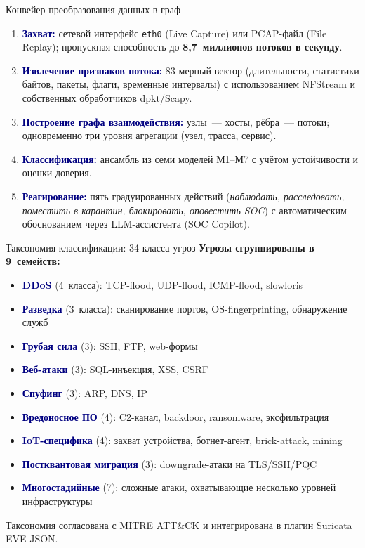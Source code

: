 \documentclass[10pt,aspectratio=169]{beamer}
\newcommand{\hl}[1]{\textcolor{accent}{\textbf{#1}}}
\newcommand{\bn}[1]{\textcolor{navy}{\textbf{#1}}}
\begin{document}
\begin{frame}{Конвейер преобразования данных в граф}
\small
\begin{enumerate}\setlength\itemsep{2pt}
\item \bn{Захват:} сетевой интерфейс \texttt{eth0} (Live
Capture) или PCAP-файл (File Replay); пропускная способность
до \hl{8{,}7~миллионов потоков в секунду}.
\item \bn{Извлечение признаков потока:} 83-мерный вектор
(длительности, статистики байтов, пакеты, флаги, временные
интервалы) с использованием NFStream и собственных
обработчиков dpkt/Scapy.
\item \bn{Построение графа взаимодействия:} узлы~--- хосты,
рёбра~--- потоки; одновременно три уровня агрегации (узел,
трасса, сервис).
\item \bn{Классификация:} ансамбль из семи моделей М1--М7
с учётом устойчивости и оценки доверия.
\item \bn{Реагирование:} пять градуированных действий
(\emph{наблюдать, расследовать, поместить в карантин,
блокировать, оповестить SOC}) с автоматическим
обоснованием через LLM-ассистента (SOC Copilot).
\end{enumerate}
\end{frame}

\begin{frame}{Таксономия классификации: 34 класса угроз}
\small
\textbf{Угрозы сгруппированы в 9~семейств:}
\begin{itemize}\setlength\itemsep{0pt}
\item \bn{DDoS} (4~класса): TCP-flood, UDP-flood, ICMP-flood, slowloris
\item \bn{Разведка} (3~класса): сканирование портов, OS-fingerprinting, обнаружение служб
\item \bn{Грубая сила} (3): SSH, FTP, web-формы
\item \bn{Веб-атаки} (3): SQL-инъекция, XSS, CSRF
\item \bn{Спуфинг} (3): ARP, DNS, IP
\item \bn{Вредоносное ПО} (4): C2-канал, backdoor, ransomware, эксфильтрация
\item \bn{IoT-специфика} (4): захват устройства, ботнет-агент, brick-attack, mining
\item \bn{Постквантовая миграция} (3): downgrade-атаки на TLS/SSH/PQC
\item \bn{Многостадийные} (7): сложные атаки, охватывающие несколько уровней инфраструктуры
\end{itemize}
\medskip

\begin{block}{}
\footnotesize Таксономия согласована с MITRE ATT\&CK и
интегрирована в плагин Suricata EVE-JSON.
\end{block}
\end{frame}
\end{document}
